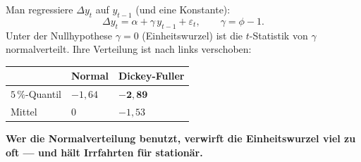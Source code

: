 \begin{merksatz}
Man regressiere $\Delta y_t$ auf $y_{t-1}$ (und eine Konstante):
\[ \Delta y_t = \alpha + \gamma\,y_{t-1} + \varepsilon_t, \qquad \gamma = \phi-1 . \]
Unter der Nullhypothese $\gamma = 0$ (Einheitswurzel) ist die $t$-Statistik von $\hat\gamma$  normalverteilt. Ihre Verteilung ist nach links verschoben:

\begin{center}
{\small
\renewcommand{\arraystretch}{1.48}
\begin{tabular}{@{}P{3.0cm}P{2.2cm}P{2.6cm}@{}}
\toprule
& \textbf{Normal} & \textbf{Dickey-Fuller}\\
\midrule
$5\,\%$-Quantil & $-1{,}64$ & $\mathbf{-2{,}89}$\\
Mittel & $0$ & $-1{,}53$\\
\bottomrule
\end{tabular}}
\end{center}

\begin{center}
\begin{minipage}{0.9\textwidth}
\textbf{Wer die Normalverteilung benutzt, verwirft die Einheitswurzel viel zu oft --- und hält Irrfahrten für stationär.}
\end{minipage}
\end{center}

\begin{center}
\begin{minipage}{0.88\textwidth}
\end{minipage}
\end{center}
\end{merksatz}


